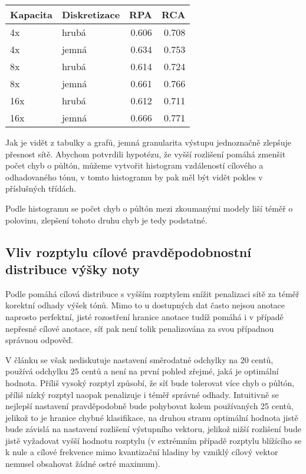     \begin{tabular}{llrr}
    \toprule
    Kapacita & Diskretizace &  RPA &  RCA \\
    \midrule
     4x &        hrubá      & 0.606 & 0.708 \\
     4x &        jemná      & 0.634 & 0.753 \\
     8x &        hrubá      & 0.614 & 0.724 \\
     8x &        jemná      & 0.661 & 0.766 \\
    16x &        hrubá      & 0.612 & 0.711 \\
    16x &        jemná      & 0.666 & 0.771 \\
    \bottomrule
    \end{tabular}


Jak je vidět z tabulky a grafů, jemná granularita výstupu jednoznačně zlepšuje přesnost sítě. Abychom potvrdili hypotézu, že vyšší rozlišení pomáhá zmenšit počet chyb o půltón, můžeme vytvořit histogram vzdáleností cílového a odhadovaného tónu, v tomto histogramu by pak měl být vidět pokles v příslušných třídách.


Podle histogramu se počet chyb o půltón mezi zkoumanými modely liší téměř o polovinu, zlepšení tohoto druhu chyb je tedy podstatné.

\subsection{Vliv rozptylu cílové pravděpodobnostní distribuce výšky noty}

Podle \cite{Bittner2017} pomáhá cílová distribuce s vyšším rozptylem snížit penalizaci sítě za téměř korektní odhady výšek tónů. Mimo to u dostupných dat často nejsou anotace naprosto perfektní, jisté rozostření hranice anotace tudíž pomáhá i v případě nepřesné cílové anotace, síť pak není tolik penalizována za svou případnou správnou odpověď. 

V článku se však nediskutuje nastavení směrodatné odchylky na 20 centů, \cite{Kim2018} používá odchylku 25 centů a není na první pohled zřejmé, jaká je optimální hodnota. Příliš vysoký rozptyl způsobí, že síť bude tolerovat více chyb o půltón, příliš nízký rozptyl naopak penalizuje i téměř správné odhady. Intuitivně se nejlepší nastavení pravděpodobně bude pohybovat kolem používaných 25 centů, jelikož to je hranice chybné klasifikace, na druhou stranu optimální hodnota jistě bude závislá na nastavení rozlišení výstupního vektoru, jelikož nižší rozlišení bude jistě vyžadovat vyšší hodnotu rozptylu (v extrémním případě rozptylu blížícího se k nule a cílové frekvence mimo kvantizační hladiny by vzniklý cílový vektor nemusel obsahovat žádné ostré maximum).


